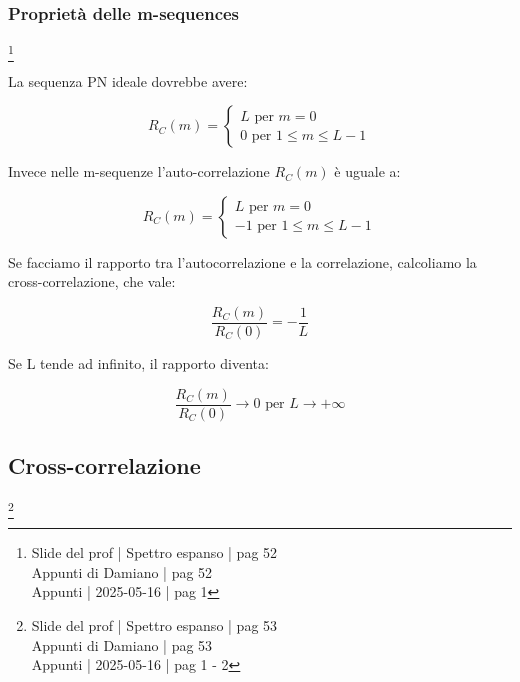 \newpage 

\subsubsection{Proprietà delle m-sequences}
\footnote{Slide del prof | Spettro espanso | pag 52 \\
Appunti di Damiano | pag 52 \\
Appunti | 2025-05-16 | pag 1 
} 

La sequenza PN ideale dovrebbe avere: 

{
    \Large 
    \begin{equation}
        R_C (m) 
        = 
        \begin{cases}
            L \text{ per } m = 0
            \\
            0 \text{ per } 1 \le m \le L-1
        \end{cases}
    \end{equation}
}

Invece nelle m-sequenze l'auto-correlazione $R_C (m)$ 
è uguale a: 

{
    \Large 
    \begin{equation}
        R_C (m) 
        = 
        \begin{cases}
            L \text{ per } m = 0
            \\
            -1 \text{ per } 1 \le m \le L-1
        \end{cases}
    \end{equation}
}



Se facciamo il rapporto tra l'autocorrelazione e la correlazione, 
calcoliamo la cross-correlazione, che vale: 

{
    \Large 
    \begin{equation}
        \frac{R_C (m)}{R_C (0)} =  - \frac{1}{L}
    \end{equation}
}

Se L tende ad infinito, il rapporto diventa: 

{
    \Large
    \begin{equation}
      \frac{R_C (m)}{R_C (0)} \to 0 \text{ per }  L \to + \infty  
    \end{equation}
}

\newpage 

\subsection{Cross-correlazione}
\footnote{Slide del prof | Spettro espanso | pag 53 \\
Appunti di Damiano | pag 53 \\
Appunti | 2025-05-16 | pag 1 - 2 
} 

